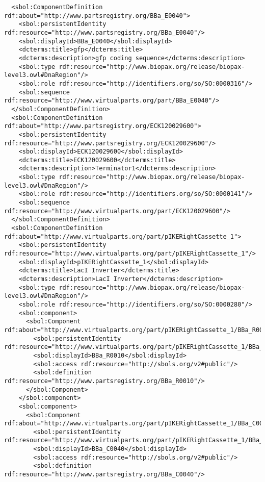 \begin{lstlisting}
  <sbol:ComponentDefinition rdf:about="http://www.partsregistry.org/BBa_E0040">
    <sbol:persistentIdentity rdf:resource="http://www.partsregistry.org/BBa_E0040"/>
    <sbol:displayId>BBa_E0040</sbol:displayId>
    <dcterms:title>gfp</dcterms:title>
    <dcterms:description>gfp coding sequence</dcterms:description>
    <sbol:type rdf:resource="http://www.biopax.org/release/biopax-level3.owl#DnaRegion"/>
    <sbol:role rdf:resource="http://identifiers.org/so/SO:0000316"/>
    <sbol:sequence rdf:resource="http://www.virtualparts.org/part/BBa_E0040"/>
  </sbol:ComponentDefinition>
  <sbol:ComponentDefinition rdf:about="http://www.partsregistry.org/ECK120029600">
    <sbol:persistentIdentity rdf:resource="http://www.partsregistry.org/ECK120029600"/>
    <sbol:displayId>ECK120029600</sbol:displayId>
    <dcterms:title>ECK120029600</dcterms:title>
    <dcterms:description>Terminator1</dcterms:description>
    <sbol:type rdf:resource="http://www.biopax.org/release/biopax-level3.owl#DnaRegion"/>
    <sbol:role rdf:resource="http://identifiers.org/so/SO:0000141"/>
    <sbol:sequence rdf:resource="http://www.virtualparts.org/part/ECK120029600"/>
  </sbol:ComponentDefinition>
  <sbol:ComponentDefinition rdf:about="http://www.virtualparts.org/part/pIKERightCassette_1">
    <sbol:persistentIdentity rdf:resource="http://www.virtualparts.org/part/pIKERightCassette_1"/>
    <sbol:displayId>pIKERightCassette_1</sbol:displayId>
    <dcterms:title>LacI Inverter</dcterms:title>
    <dcterms:description>LacI Inverter</dcterms:description>
    <sbol:type rdf:resource="http://www.biopax.org/release/biopax-level3.owl#DnaRegion"/>
    <sbol:role rdf:resource="http://identifiers.org/so/SO:0000280"/>
    <sbol:component>
      <sbol:Component rdf:about="http://www.virtualparts.org/part/pIKERightCassette_1/BBa_R0010">
        <sbol:persistentIdentity rdf:resource="http://www.virtualparts.org/part/pIKERightCassette_1/BBa_R0010"/>
        <sbol:displayId>BBa_R0010</sbol:displayId>
        <sbol:access rdf:resource="http://sbols.org/v2#public"/>
        <sbol:definition rdf:resource="http://www.partsregistry.org/BBa_R0010"/>
      </sbol:Component>
    </sbol:component>
    <sbol:component>
      <sbol:Component rdf:about="http://www.virtualparts.org/part/pIKERightCassette_1/BBa_C0040">
        <sbol:persistentIdentity rdf:resource="http://www.virtualparts.org/part/pIKERightCassette_1/BBa_C0040"/>
        <sbol:displayId>BBa_C0040</sbol:displayId>
        <sbol:access rdf:resource="http://sbols.org/v2#public"/>
        <sbol:definition rdf:resource="http://www.partsregistry.org/BBa_C0040"/>

\end{lstlisting}
